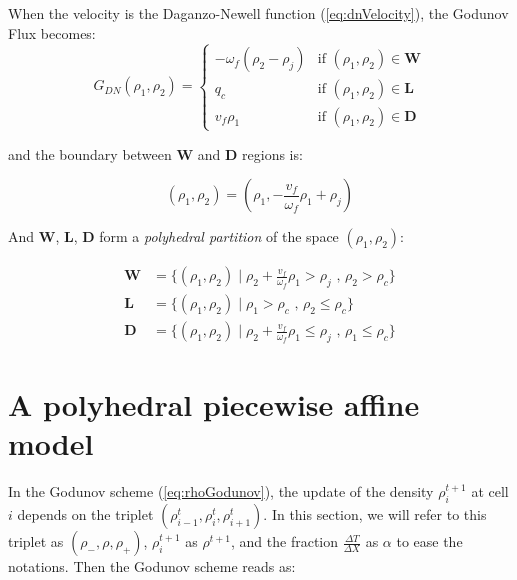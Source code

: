 \documentclass[11pt]{article}
\numberwithin{equation}{section}
\numberwithin{figure}{section}
\numberwithin{table}{section}
\begin{document}
\noindent When the velocity is the Daganzo-Newell function (\ref{eq:dnVelocity}), the Godunov Flux becomes:
\begin{equation} \label{eq:rhoGodunovFlux3}
G_{DN}(\rho_{1},\rho_{2}) = \begin{cases}
-\omega_{f} \left( \rho_{2} - \rho_{j} \right) & \text{if } (\rho_{1},\rho_{2}) \in \textbf{W}\\
q_{c} & \text{if } (\rho_{1},\rho_{2}) \in \textbf{L}\\
v_{f} \rho_{1} & \text{if } (\rho_{1},\rho_{2}) \in \textbf{D}
\end{cases}
\end{equation}

\noindent and the boundary between \textbf{W} and \textbf{D} regions is:

\begin{equation} \label{eq:boundary}
(\rho_{1},\rho_{2})=(\rho_{1},-\frac{v_{f}}{\omega_{f}}\rho_{1}+\rho_{j})
\end{equation}

\noindent And \textbf{W}, \textbf{L}, \textbf{D} form a \textit{polyhedral partition} of the space $(\rho_{1},\rho_{2})$:

\begin{equation}
\begin{array}{ll}
\textbf{W} & = \{(\rho_{1},\rho_{2}) \mid \rho_{2} + \frac{v_{f}}{\omega_{f}}\rho_{1} > \rho_{j} \text{ ,   } \rho_{2} > \rho_{c}\}\\
\textbf{L} & = \{(\rho_{1},\rho_{2}) \mid \rho_{1} > \rho_{c} \text{ ,   } \rho_{2} \leq \rho_{c}\}\\
\textbf{D} & = \{(\rho_{1},\rho_{2}) \mid \rho_{2} + \frac{v_{f}}{\omega_{f}}\rho_{1} \leq \rho_{j} \text{ ,   } \rho_{1} \leq \rho_{c}\}\end{array}
\label{eq:regions2}
\end{equation}

\section{A polyhedral piecewise affine model}

In the Godunov scheme (\ref{eq:rhoGodunov}), the update of the density $\rho^{t+1}_{i}$ at cell $i$ depends on the triplet $(\rho^{t}_{i-1}, \rho^{t}_{i}, \rho^{t}_{i+1})$. In this section, we will refer to this triplet as $(\rho_{-}, \rho, \rho_{+})$, $\rho^{t+1}_{i}$ as $\rho^{t+1}$, and the fraction $\frac{\Delta T}{\Delta X}$ as $\alpha$ to ease the notations. Then the Godunov scheme reads as:
\end{document}
